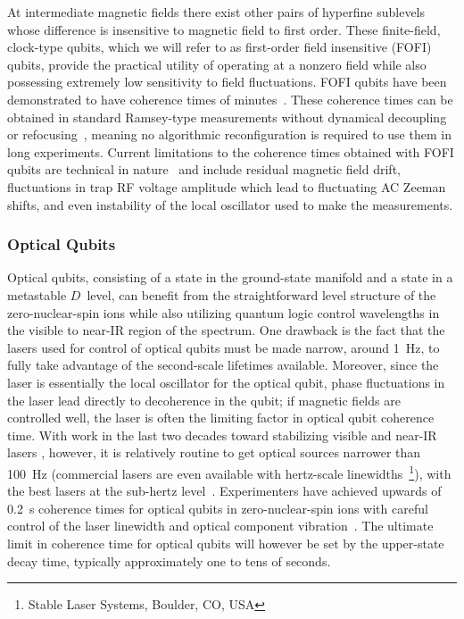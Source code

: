 \documentclass[%
reprint,
 amsmath,amssymb,
]{revtex4-1}
\begin{document}
At intermediate magnetic fields there exist other pairs of hyperfine sublevels whose difference is insensitive to magnetic field to first order.  These finite-field, clock-type qubits, which we will refer to as first-order field insensitive (FOFI) qubits, provide the practical utility of operating at a nonzero field while also possessing extremely low sensitivity to field fluctuations.  FOFI qubits have been demonstrated to have coherence times of minutes~\cite{bollinger_IEEE_550s_ramsey,HartyHighFidelityIons2014}.  These coherence times can be obtained in standard Ramsey-type measurements without dynamical decoupling or refocusing~\cite{PhysRev.80.580,ViolaDynamicDecoup1998}, meaning no algorithmic reconfiguration is required to use them in long experiments.  Current limitations to the coherence times obtained with FOFI qubits are technical in nature~\cite{langer2005long,HartyHighFidelityIons2014} and include residual magnetic field drift, fluctuations in trap RF voltage amplitude which lead to fluctuating AC Zeeman shifts, and even instability of the local oscillator used to make the measurements.


\subsubsection{Optical Qubits}

Optical qubits, consisting of a state in the ground-state manifold and a state in a metastable $D$~level, can benefit from the straightforward level structure of the zero-nuclear-spin ions while also utilizing quantum logic control wavelengths in the visible to near-IR region of the spectrum.  One drawback is the fact that the lasers used for control of optical qubits must be made narrow, around 1~Hz, to fully take advantage of the second-scale lifetimes available.  Moreover, since the laser is essentially the local oscillator for the optical qubit, phase fluctuations in the laser lead directly to decoherence in the qubit; if magnetic fields are controlled well, the laser is often the limiting factor in optical qubit coherence time. With work in the last two decades toward stabilizing visible and near-IR lasers \cite{ZHAOSubHertz2010}, however, it is relatively routine to get optical sources narrower than 100~Hz (commercial lasers are even available with hertz-scale linewidths~\footnote{Stable Laser Systems, Boulder, CO, USA}), with the best lasers at the sub-hertz level~\cite{Kessler2012}.  Experimenters have achieved upwards of 0.2~s coherence times for optical qubits in zero-nuclear-spin ions with careful control of the laser linewidth and optical component vibration~\cite{BermudezAssessing2017}.  The ultimate limit in coherence time for optical qubits will however be set by the upper-state decay time, typically approximately one to tens of seconds.
\end{document}
